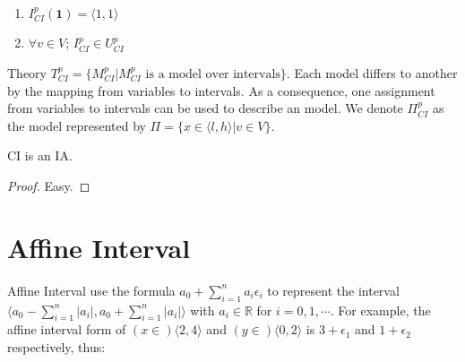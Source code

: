 \begin{enumerate}
\begin{itemize}
\end{itemize}
\item $I^p_{CI}(\mathbf{1}) = \langle 1,1\rangle $
\item $\forall v \in V$; $I^p_{CI} \in U^p_{CI}$
\end{enumerate}
Theory $T^p_{CI} = \{M^p_{CI}| M^p_{CI} \text{ is a model over intervals}\}$. Each model differs to another by the mapping from variables to intervals. As a consequence, one assignment from variables to intervals can be used to describe an model. We denote $\Pi^p_{CI}$ as the model represented by $\Pi = \{x \in \langle l, h\rangle  | v \in V\}$. 
\begin{theorem}
CI is an IA.
\end{theorem}
\begin{proof}
Easy.
\end{proof}
\section{Affine Interval}
Affine Interval use the formula $a_0 + \sum\limits_{i=1}^{n} a_i\epsilon_i$ to represent the interval $\langle a_0 - \sum\limits_{i=1}^{n}|a_i|, a_0 + \sum\limits_{i=1}^{n}|a_i| \rangle$ with $a_i \in \mathbb{R}$ for $i = 0, 1, \cdots$. For example, the affine interval form of $(x \in) \langle 2, 4 \rangle$ and $(y \in) \langle 0, 2 \rangle$ is $3 + \epsilon_1$ and $1 + \epsilon_2$ respectively, thus:

